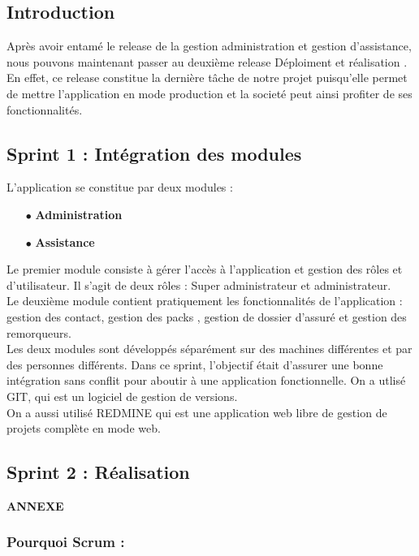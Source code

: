 \documentclass{article}
\begin{document}
\subsection{Introduction}
Après avoir entamé le release de la gestion administration et gestion d'assistance,
nous pouvons maintenant passer au deuxième release \guillemotleft Déploiment et réalisation \guillemotright.
En effet, ce release constitue la dernière tâche  de notre projet puisqu'elle permet de mettre l'application en mode production et la societé peut ainsi profiter de ses fonctionnalités.
\subsection{Sprint 1 : Intégration des modules }
L'application se constitue par deux modules : \\
\begin{enumerate}
\item[$\bullet$] \textbf{ Administration}
\item[$\bullet$] \textbf{ Assistance }
\end{enumerate}
Le premier module consiste à gérer l'accès à l'application et gestion des rôles et d'utilisateur.
Il s'agit de deux rôles : Super administrateur et administrateur.\\
Le deuxième module contient pratiquement les fonctionnalités de l'application : gestion des contact, gestion des packs , gestion de dossier d'assuré et gestion des remorqueurs.\\
Les deux modules sont développés séparément sur des machines différentes et par des personnes différents. Dans ce sprint, l'objectif était d'assurer une bonne intégration sans conflit pour aboutir à une application fonctionnelle.
On a utlisé GIT, qui est un logiciel de gestion de versions.\\
On a aussi utilisé REDMINE qui est une application web libre de gestion de projets complète en mode web. 
\subsection{Sprint 2 : Réalisation }
\begin{titlepage}\centering
\vspace*{\fill}
\textbf{\LARGE ANNEXE }
\vspace*{\fill}
\end{titlepage}
\setcounter{page}{41}
\appendix
\subsubsection*{Pourquoi Scrum :}
\vspace{0.5cm}
\vspace{0.3cm}
\end{document}
